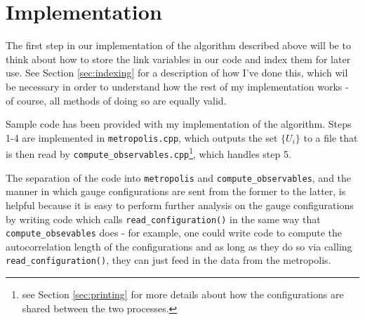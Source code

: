\documentclass[11pt]{article}
\begin{document}

\section{Implementation}

\label{sec:implementation}

The first step in our implementation of the algorithm described above will be to think about how to store the link variables in our code and index them for later use. See Section \ref{sec:indexing} for a description of how I've done this, which wil be necessary in order to understand how the rest of my implementation works - of course, all methods of doing so are equally valid. 

Sample code has been provided with my implementation of the algorithm. Steps 1-4 are implemented in \lstinline{metropolis.cpp}, which outputs the set $\{U_i\}$ to a file that is then read by \lstinline{compute_observables.cpp}\footnote{see Section \ref{sec:printing} for more details about how the configurations are shared between the two processes.}, which handles step 5.

The separation of the code into \lstinline{metropolis} and \lstinline{compute_observables}, and the manner in which gauge configurations are sent from the former to the latter, is helpful because it is easy to perform further analysis on the gauge configurations by writing code which calls \lstinline{read_configuration()} in the same way that \lstinline{compute_obsevables} does - for example, one could write code to compute the autocorrelation length of the configurations and as long as they do so via calling \lstinline{read_configuration()}, they can just feed in the data from the metropolis.
\end{document}
